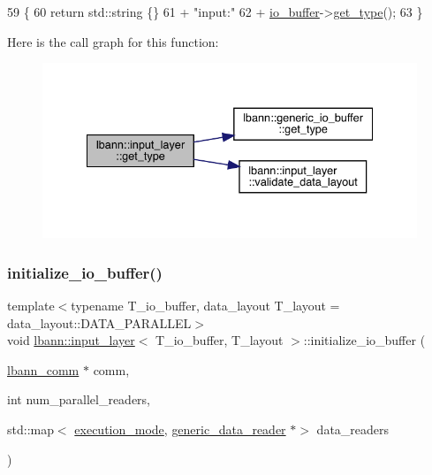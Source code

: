 \begin{DoxyCode}
59                                       \{
60     \textcolor{keywordflow}{return} std::string \{\}
61       + \textcolor{stringliteral}{"input:"}
62       + \hyperlink{classlbann_1_1generic__input__layer_a9dfe8b9afaebc7a5bcb0177ee2ab428f}{io\_buffer}->\hyperlink{classlbann_1_1generic__io__buffer_adc77c0a280f8a200a8d8495c3a371ebb}{get\_type}();
63   \}
\end{DoxyCode}
Here is the call graph for this function\+:\nopagebreak
\begin{figure}[H]
\begin{center}
\leavevmode
\includegraphics[width=334pt]{classlbann_1_1input__layer_af596126d1b2d1604743906d04d32419b_cgraph}
\end{center}
\end{figure}
\mbox{\label{classlbann_1_1input__layer_a645fce2e882892ac0ad8c9b06ea6ed09}} 
\subsubsection{\texorpdfstring{initialize\+\_\+io\+\_\+buffer()}{initialize\_io\_buffer()}}
{\footnotesize\ttfamily template$<$typename T\+\_\+io\+\_\+buffer, data\+\_\+layout T\+\_\+layout = data\+\_\+layout\+::\+D\+A\+T\+A\+\_\+\+P\+A\+R\+A\+L\+L\+EL$>$ \\
void \hyperlink{classlbann_1_1input__layer}{lbann\+::input\+\_\+layer}$<$ T\+\_\+io\+\_\+buffer, T\+\_\+layout $>$\+::initialize\+\_\+io\+\_\+buffer (\begin{DoxyParamCaption}\item[{\hyperlink{classlbann_1_1lbann__comm}{lbann\+\_\+comm} $\ast$}]{comm,  }\item[{int}]{num\+\_\+parallel\+\_\+readers,  }\item[{std\+::map$<$ \hyperlink{base_8hpp_a2781a159088df64ed7d47cc91c4dc0a8}{execution\+\_\+mode}, \hyperlink{classlbann_1_1generic__data__reader}{generic\+\_\+data\+\_\+reader} $\ast$$>$}]{data\+\_\+readers }\end{DoxyParamCaption})\hspace{0.3cm}{\ttfamily [inline]}}



